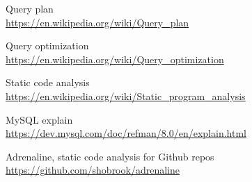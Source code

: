\documentclass{article}
\begin{document}
\begin{thebibliography}{9}
\bibitem{} Query plan \\ \url{https://en.wikipedia.org/wiki/Query_plan}

\bibitem{} Query optimization \\ \url{https://en.wikipedia.org/wiki/Query_optimization}

\bibitem{} Static code analysis \\ \url{https://en.wikipedia.org/wiki/Static_program_analysis}

\bibitem{} MySQL explain \\ \url{https://dev.mysql.com/doc/refman/8.0/en/explain.html}


\bibitem{} Adrenaline, static code analysis for Github repos \\ \url{https://github.com/shobrook/adrenaline}



\end{thebibliography}
\end{document}
